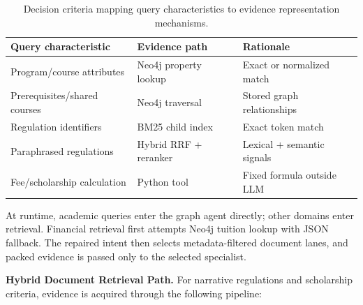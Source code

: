 \begin{table}[h!]
\centering
\caption{Decision criteria mapping query characteristics to evidence representation mechanisms.}
\label{tab:decision_criteria}
\setlength{\tabcolsep}{3pt}
\renewcommand{\arraystretch}{1.1}
\begin{tabular}{>{\raggedright\arraybackslash}p{}>{\raggedright\arraybackslash}p{}>{\raggedright\arraybackslash}p{}}
\toprule
\textbf{Query characteristic} & \textbf{Evidence path} & \textbf{Rationale} \\
\midrule
Program/course attributes & Neo4j property lookup & Exact or normalized match \\
Prerequisites/shared courses & Neo4j traversal & Stored graph relationships \\
Regulation identifiers & BM25 child index & Exact token match \\
Paraphrased regulations & Hybrid RRF + reranker & Lexical + semantic signals \\
Fee/scholarship calculation & Python tool & Fixed formula outside LLM \\
\bottomrule
\end{tabular}
\end{table}

At runtime, academic queries enter the graph agent directly; other domains enter retrieval. Financial retrieval first attempts Neo4j tuition lookup with JSON fallback. The repaired intent then selects metadata-filtered document lanes, and packed evidence is passed only to the selected specialist.

\textbf{Hybrid Document Retrieval Path.}
For narrative regulations and scholarship criteria, evidence is acquired
through the following pipeline:


